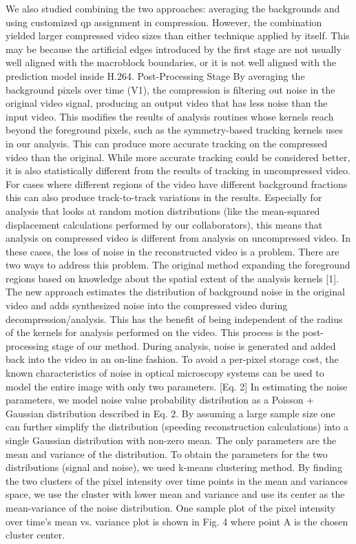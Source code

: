 We also studied combining the two approaches: averaging the backgrounds and using customized qp assignment in compression. However, the combination yielded larger compressed video sizes than either technique applied by itself. This may be because the artificial edges introduced by the first stage are not usually well aligned with the macroblock boundaries, or it is not well aligned with the prediction model inside H.264.
Post-Processing Stage
By averaging the background pixels over time (V1), the compression is filtering out noise in the original video signal, producing an output video that has less noise than the input video.  This modifies the results of analysis routines whose kernels reach beyond the foreground pixels, such as the symmetry-based tracking kernels uses in our analysis.  This can produce more accurate tracking on the compressed video than the original.  While more accurate tracking could be considered better, it is also statistically different from the results of tracking in uncompressed video.  For cases where different regions of the video have different background fractions this can also produce track-to-track variations in the results.  Especially for analysis that looks at random motion distributions (like the mean-squared displacement calculations performed by our collaborators), this means that analysis on compressed video is different from analysis on uncompressed video.  In these cases, the loss of noise in the reconstructed video is a problem.
There are two ways to address this problem. The original method expanding the foreground regions based on knowledge about the spatial extent of the analysis kernels [1]. The new approach estimates the distribution of background noise in the original video and adds synthesized noise into the compressed video during decompression/analysis.  This has the benefit of being independent of the radius of the kernels for analysis performed on the video. This process is the post-processing stage of our method. During analysis, noise is generated and added back into the video in an on-line fashion. To avoid a per-pixel storage cost, the known characteristics of noise in optical microscopy systems can be used to model the entire image with only two parameters.
       [Eq. 2]
In estimating the noise parameters, we model noise value probability distribution as a Poisson + Gaussian distribution described in Eq. 2. By assuming a large sample size one can further simplify the distribution (speeding reconstruction calculations) into a single Gaussian distribution with non-zero mean. The only parameters are the mean and variance of the distribution. To obtain the parameters for the two distributions (signal and noise), we used k-means clustering method. By finding the two clusters of the pixel intensity over time points in the mean and variances space, we use the cluster with lower mean and variance and use its center as the mean-variance of the noise distribution. One sample plot of the pixel intensity over time’s mean vs. variance plot is shown in Fig. 4 where point A is the chosen cluster center.
